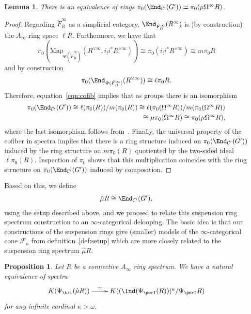 \documentclass{amsart}
\newcommand{\htp}{\simeq}
\newcommand{\cF}{{\mathcal F}}
\let\catsymbfont\mathcal
\newcommand{\aC}{{\catsymbfont{C}}}
\newcommand{\Map}{\mathrm{Map}}%
\renewcommand{\i}{\infty}
\newcommand{\kcone}{\cF_{\kappa}}
\numberwithin{equation}{section}
\newtheorem{lemma}[equation]{Lemma}
\newtheorem{proposition}[equation]{Proposition}
\theoremstyle{definition}
\begin{document}
\begin{lemma}\label{lem:matcomp}
There is an equivalence of rings
$\pi_0(\End_{\aC'}(G')) \simeq \pi_0(\mu\Omega^\infty R)$.
\end{lemma}

\begin{proof}
Regarding $\tilde{F}_R^{\infty}$ as a simplicial category,
$\End_{\tilde{F}_R^{\infty}}(R^{\infty})$ is (by construction) the
$A_\infty$ ring space $\ell R$.
Furthermore, we have that 
\[
\pi_0(\Map_{\Psi(\tilde{F}_R^{\infty})}(R^{\lor \infty}, i_! i^*
R^{\lor \infty})) \cong \pi_0 (i_! i^* R^{\lor \infty}) \cong m \pi_0 R
\]
and by construction
\[
\pi_0(\End_{\Psi(\tilde{F}_R^{\infty})}(R^{\lor \infty})) \cong \ell \pi_0
R.
\]
Therefore, equation~\ref{eqn:cofib} implies that as groups there is an
isomorphism  
\begin{eqnarray*}
\pi_0(\End_{\aC'}(G')) \cong \ell (\pi_0(R)) / m (\pi_0(R)) \cong \ell (\pi_0
(\Omega^\infty R)) / m (\pi_0 (\Omega^\infty R)) \\ \cong \mu \pi_0(\Omega^\infty
R) \cong \pi_0(\mu \Omega^\infty R),
\end{eqnarray*}
where the last isomorphism follows from~\cite[5.1]{noncondeloop}.
Finally, the universal property of the cofiber in spectra implies that
there is a ring structure induced on $\pi_0(\End_{\aC'}(G'))$ induced
by the ring structure on $m \pi_0(R)$ quotiented by the two-sided
ideal $\ell \pi_0 (R)$.  Inspection of $\pi_0$ shows that this
multiplication coincides with the ring structure on
$\pi_0(\End_{\aC'}(G'))$ induced by composition.
\end{proof}

Based on this, we define
\[
\hat{\mu} R \cong \End_{\aC'}(G'),
\]
using the setup described above, and we proceed to relate this suspension ring spectrum construction to an $\i$-categorical delooping.
The basic idea is that our constructions
of the suspension rings give (smaller) models of the $\i$-categorical
cone $\kcone$ from definition~\ref{def:setup} which are more closely
related to the suspension ring spectrum $\hat{\mu} R$.

\begin{proposition}\label{prop:suspring}
Let $R$ be a connective $A_\infty$ ring spectrum.  We have a natural
equivalence of spectra 
\[
\xymatrix{
K(\Psi_{\tri}(\hat{\mu} R)) \ar[r]^-{\htp} &
K((\Ind(\Psi_{\perf}(R)))^{\kappa}/ \Psi_{\perf}{R}) \\
}
\]
for any infinite cardinal $\kappa > \omega$.
\end{proposition}
\end{document}
